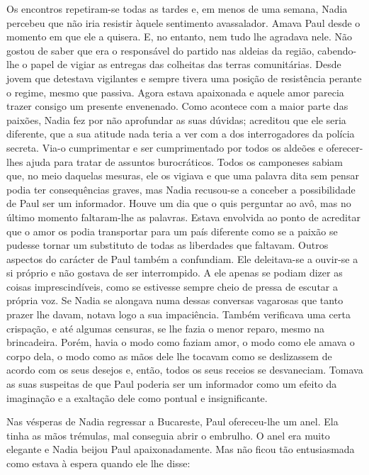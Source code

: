 Os encontros repetiram-se todas as tardes e, em menos de uma semana,
Nadia percebeu que não iria resistir àquele sentimento avassalador.
Amava Paul desde o momento em
que ele a quisera. E, no entanto, nem tudo lhe agradava nele. Não gostou
de saber que era o responsável do partido nas aldeias da região,
cabendo-lhe o papel de vigiar as entregas das colheitas das terras
comunitárias. Desde jovem que detestava vigilantes e sempre tivera uma
posição de resistência perante o regime, mesmo que passiva. Agora estava
apaixonada e aquele amor parecia trazer consigo um presente envenenado.
Como acontece com a maior parte das paixões, Nadia fez por não
aprofundar as suas dúvidas; acreditou que ele seria diferente, que a sua
atitude nada teria a ver com a dos interrogadores da polícia secreta.
Via-o cumprimentar e ser cumprimentado por todos os aldeões e
oferecer-lhes ajuda para tratar de assuntos burocráticos. Todos os
camponeses sabiam que, no meio daquelas mesuras, ele os vigiava e que
uma palavra dita sem pensar podia ter consequências graves, mas Nadia
recusou-se a conceber a possibilidade de Paul ser um informador. Houve
um dia que o quis perguntar ao avô, mas no último momento faltaram-lhe
as palavras. Estava envolvida ao ponto de acreditar que o amor os
podia transportar para um país diferente como se a paixão se pudesse
tornar um substituto de todas as liberdades que faltavam. Outros
aspectos do carácter de Paul também a confundiam. Ele deleitava-se a
ouvir-se a si próprio e não gostava de ser interrompido. A ele apenas se
podiam dizer as coisas imprescindíveis, como se estivesse sempre cheio
de pressa de escutar a própria voz. Se Nadia se alongava numa dessas
conversas vagarosas que tanto prazer lhe davam, notava logo a sua
impaciência. Também verificava uma certa crispação, e até algumas
censuras, se lhe fazia
o menor reparo, mesmo na brincadeira. Porém, havia o modo como faziam
amor, o modo como ele amava o corpo dela, o modo como as mãos dele lhe
tocavam como se deslizassem de acordo com os seus desejos e, então,
todos os seus receios se desvaneciam. Tomava as suas suspeitas de que
Paul poderia ser um informador como um efeito da imaginação e a
exaltação dele como pontual e insignificante.

Nas vésperas de Nadia regressar a Bucareste, Paul ofereceu-lhe um anel.
Ela tinha as mãos trémulas, mal conseguia abrir o embrulho. O anel era
muito elegante e Nadia beijou Paul apaixonadamente. Mas não ficou tão
entusiasmada como estava à espera quando ele lhe disse:


